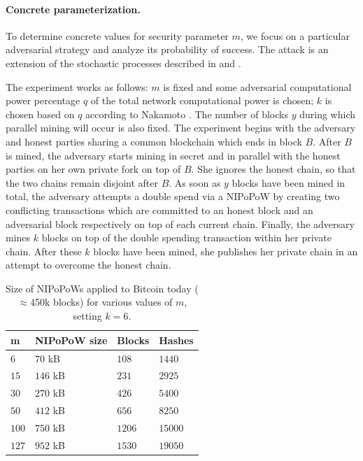 \paragraph{Concrete parameterization.}
To determine concrete values for security parameter $m$, we focus on a
particular adversarial strategy and analyze its probability of success.
The attack is an extension of the stochastic processes described in
\cite{bitcoin} and \cite{rosenfeld}.

The experiment works as follows: $m$ is fixed and some adversarial computational
power percentage $q$ of the total network computational power is chosen; $k$ is
chosen based on $q$ according to Nakamoto \cite{bitcoin}. The number of blocks
$y$ during which parallel mining will occur is also fixed. The experiment begins
with the adversary and honest parties sharing a common blockchain which ends in
block $B$. After $B$ is mined, the adversary starts mining in secret and in
parallel with the honest parties on her own private fork on top of $B$. She
ignores the honest chain, so that the two chains remain disjoint after $B$. As
soon as $y$ blocks have been mined in total, the adversary attempts a double
spend via a NIPoPoW
by creating two conflicting transactions which are committed to an honest
block and an adversarial block respectively on top of each current chain.
Finally, the adversary mines $k$ blocks on top of the double spending
transaction within her private chain. After these $k$ blocks have been mined,
she publishes her private chain in an attempt to overcome the honest chain.


\begin{table}
  \caption{
    \label{table.size}
    Size of NIPoPoWs applied to Bitcoin today
    ($\approx$450k blocks) for various values of $m$,
    setting $k = 6$.
  }
  \centering
  \begin{tabular}{l|l|l|l}
      {\bf m}  & {\bf NIPoPoW size} & {\bf Blocks} & {\bf
      Hashes}\\
      \hline
      $6$   & $70$  kB & $108$ & $1440$  \\
      $15$  & $146$ kB & $231$ & $2925$  \\
      $30$  & $270$ kB & $426$ & $5400$  \\
      $50$  & $412$ kB & $656$ & $8250$ \\
      $100$ & $750$ kB & $1206$ & $15000$ \\
      $127$ & $952$ kB & $1530$ & $19050$ \\
  \end{tabular}
\end{table}



